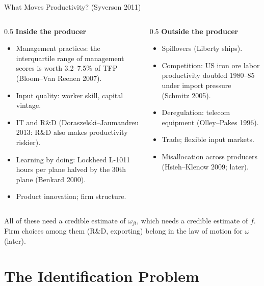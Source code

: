 \documentclass[aspectratio=169,10pt]{beamer}
\begin{document}
\begin{frame}{What Moves Productivity? (Syverson 2011)}
\begin{columns}[T]
\begin{column}{0.5\textwidth}
\textbf{Inside the producer}
\begin{itemize}
\item Management practices: the interquartile range of management scores is worth 3.2--7.5\% of TFP (Bloom--Van Reenen 2007).
\item Input quality: worker skill, capital vintage.
\item IT and R\&D (Doraszelski--Jaumandreu 2013: R\&D also makes productivity riskier).
\item Learning by doing: Lockheed L-1011 hours per plane halved by the 30th plane (Benkard 2000).
\item Product innovation; firm structure.
\end{itemize}
\end{column}
\begin{column}{0.5\textwidth}
\textbf{Outside the producer}
\begin{itemize}
\item Spillovers (Liberty ships).
\item Competition: US iron ore labor productivity doubled 1980--85 under import pressure (Schmitz 2005).
\item Deregulation: telecom equipment (Olley--Pakes 1996).
\item Trade; flexible input markets.
\item Misallocation across producers (Hsieh--Klenow 2009; later).
\end{itemize}
\end{column}
\end{columns}
\vfill
All of these need a credible estimate of $\omega_{jt}$, which needs a credible estimate of $f$. Firm choices among them (R\&D, exporting) belong in the law of motion for $\omega$ (later).
\end{frame}


\section{The Identification Problem}
\end{document}
